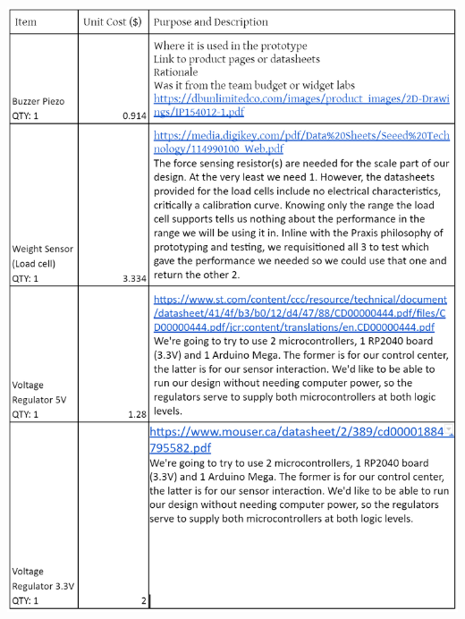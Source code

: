 \documentclass[12pt]{article}
\begin{document}
        \includegraphics[width=\linewidth]{BOMpg1.png}

        \newpage
\end{document}

